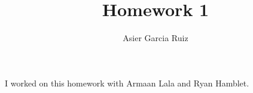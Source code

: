 \documentclass{article}
\title{Homework 1}
\author{Asier Garcia Ruiz}
\begin{document}
\maketitle

I worked on this homework with Armaan Lala and Ryan Hamblet.
\end{document}
